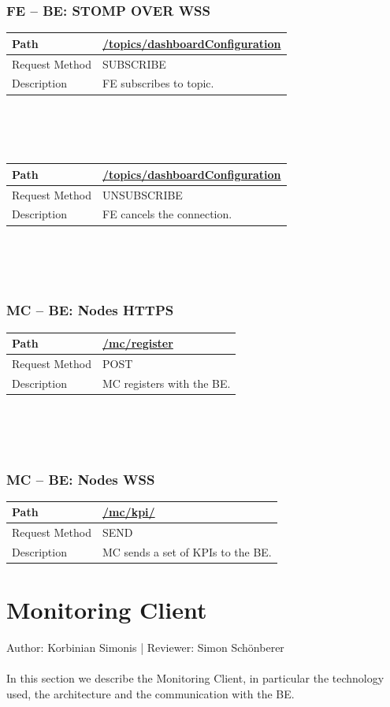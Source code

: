 \documentclass{scrreprt}
\begin{document}
\subsubsection{FE -- BE: STOMP OVER WSS}
\begin{tabularx}{12cm}{l|l}
	Path & \url{/topics/dashboardConfiguration} \\\hline
	Request Method & SUBSCRIBE \\\hline
	Description & FE subscribes to topic.
\end{tabularx}
\\
\\ \\
\begin{tabularx}{12cm}{l|l}
	Path & \url{/topics/dashboardConfiguration} \\\hline
	Request Method & UNSUBSCRIBE \\\hline
	Description & FE cancels the connection. 
\end{tabularx}
\\
\\ \\
\subsubsection{MC -- BE: Nodes HTTPS}
\begin{tabularx}{12cm}{l|l}
	Path & \url{/mc/register} \\\hline
	Request Method & POST \\\hline
	Description & MC registers with the BE. 
\end{tabularx}
\\
\\ \\
\subsubsection{MC -- BE: Nodes WSS}
\begin{tabularx}{12cm}{l|l}
	Path & \url{/mc/kpi/} \\\hline
	Request Method & SEND \\\hline
	Description & MC sends a set of KPIs to the BE. 
\end{tabularx}
\section{Monitoring Client}
Author: Korbinian Simonis | Reviewer: Simon Sch\"onberer \\ \\
In this section we describe the Monitoring Client, in particular the technology used, the architecture and the communication with the BE.
\end{document}
